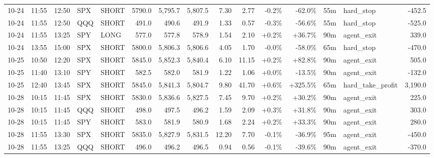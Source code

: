 \documentclass[11pt,a4paper,twoside]{article}
\begin{document}
\begin{landscape}
\begin{center}
\begin{longtable}{>{\color{txtmain}}l l l l l r r r r r r r r >{\color{txtmain}}l r}
10-24 & 11:55 & 12:50 & SPX & SHORT & 5790.0 & 5,795.7 & 5,807.5 & 7.30 & 2.77 & \textcolor{lossred}{-0.2\%} & \textcolor{lossred}{-62.0\%} & 55m & hard\_stop & \textcolor{lossred}{-452.5} \\
10-24 & 11:55 & 12:50 & QQQ & SHORT & 491.0 & 490.6 & 491.9 & 1.33 & 0.57 & \textcolor{lossred}{-0.3\%} & \textcolor{lossred}{-56.6\%} & 55m & hard\_stop & \textcolor{lossred}{-525.0} \\
10-24 & 11:55 & 13:25 & SPY & LONG & 577.0 & 577.8 & 578.9 & 1.54 & 2.10 & \textcolor{wingreen}{+0.2\%} & \textcolor{wingreen}{+36.7\%} & 90m & agent\_exit & \textcolor{wingreen}{339.0} \\
10-24 & 13:55 & 15:00 & SPX & SHORT & 5800.0 & 5,806.3 & 5,806.6 & 4.05 & 1.70 & \textcolor{lossred}{-0.0\%} & \textcolor{lossred}{-58.0\%} & 65m & hard\_stop & \textcolor{lossred}{-470.0} \\
10-25 & 10:50 & 12:20 & SPX & SHORT & 5845.0 & 5,852.3 & 5,840.4 & 6.10 & 11.15 & \textcolor{wingreen}{+0.2\%} & \textcolor{wingreen}{+82.8\%} & 90m & agent\_exit & \textcolor{wingreen}{505.0} \\
10-25 & 11:40 & 13:10 & SPY & SHORT & 582.5 & 582.0 & 581.9 & 1.22 & 1.06 & \textcolor{wingreen}{+0.0\%} & \textcolor{lossred}{-13.5\%} & 90m & agent\_exit & \textcolor{lossred}{-132.0} \\
10-25 & 12:40 & 13:45 & SPX & SHORT & 5845.0 & 5,841.3 & 5,804.7 & 9.80 & 41.70 & \textcolor{wingreen}{+0.6\%} & \textcolor{wingreen}{+325.5\%} & 65m & hard\_take\_profit & \textcolor{wingreen}{3,190.0} \\
10-28 & 10:15 & 11:45 & SPX & SHORT & 5830.0 & 5,836.6 & 5,827.5 & 7.45 & 9.70 & \textcolor{wingreen}{+0.2\%} & \textcolor{wingreen}{+30.2\%} & 90m & agent\_exit & \textcolor{wingreen}{225.0} \\
10-28 & 10:15 & 11:45 & QQQ & SHORT & 498.0 & 497.5 & 496.2 & 1.59 & 2.09 & \textcolor{wingreen}{+0.3\%} & \textcolor{wingreen}{+31.8\%} & 90m & agent\_exit & \textcolor{wingreen}{303.0} \\
10-28 & 10:15 & 11:45 & SPY & SHORT & 583.0 & 581.9 & 580.9 & 1.68 & 2.24 & \textcolor{wingreen}{+0.2\%} & \textcolor{wingreen}{+33.3\%} & 90m & agent\_exit & \textcolor{wingreen}{280.0} \\
10-28 & 11:55 & 13:30 & SPX & SHORT & 5835.0 & 5,827.9 & 5,831.5 & 12.20 & 7.70 & \textcolor{lossred}{-0.1\%} & \textcolor{lossred}{-36.9\%} & 95m & agent\_exit & \textcolor{lossred}{-450.0} \\
10-28 & 11:55 & 13:25 & QQQ & SHORT & 496.0 & 496.2 & 496.5 & 0.94 & 0.56 & \textcolor{lossred}{-0.1\%} & \textcolor{lossred}{-39.6\%} & 90m & agent\_exit & \textcolor{lossred}{-370.0} \\

\end{longtable}
\end{center}
\end{landscape}
\end{document}
